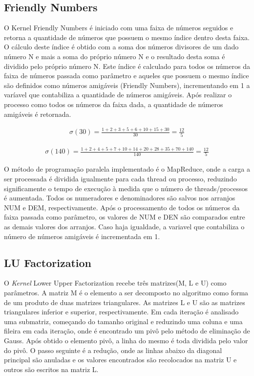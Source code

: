 \documentclass[12pt]{article}
\begin{document}
\subsection{Friendly Numbers}

O Kernel Friendly Numbers é iniciado com uma faixa de números seguidos e retorna a quantidade de números que possuem o mesmo índice dentro desta faixa. O cálculo deste índice é obtido com a soma dos números divisores de um dado número N e mais a soma do próprio número N e o resultado desta soma é dividido pelo próprio número N. Este índice é calculado para todos os números da faixa de números passada como parâmetro e aqueles que possuem o mesmo índice são definidos como números amigáveis (Friendly Numbers), incrementando em 1 a varíavel que contabiliza a quantidade de números amigáveis. Após realizar o processo como todos os números da faixa dada, a quantidade de números amigáveis é retornada. 

\begin{gather*}
{\sigma \left ( 30 \right )} =  \frac{1+2+3+5+6+10+15+30}{30} = \frac{12}{5}
\end{gather*}

\begin{gather*}
{\sigma \left ( 140 \right )} = \frac{1+2+4+5+7+10+14+20+28+35+70+140}{140}=\frac{12}{5}
\end{gather*}


O método de programação paralela implementado é o MapReduce, onde a carga a ser processada é dividida igualmente para cada thread ou processo, reduzindo significamente o tempo de execução à medida que o número de threads/processos é aumentada. Todos os numeradores e denominadores são salvos nos arranjos NUM e DEM, respectivamente. Após o processamento de todos os números da faixa passada como parâmetro,
os valores de NUM e DEN são comparados entre as demais valores dos arranjos. Caso haja igualdade, a variavel que contabiliza o número de números amigáveis é incrementada em 1.

\subsection{LU Factorization}

O \textit{Kernel} Lower Upper Factorization recebe três matrizes(M, L e U) como parâmetros. A matriz M é o elemento a ser decomposto no algoritmo como forma de um produto de duas matrizes triangulares. As matrizes L e U são as matrizes triangulares inferior e superior, respectivamente. Em cada iteração é analisado uma submatriz, começando do tamanho original e reduzindo uma coluna e uma fileira em cada iteração, onde é encontrado um pivô pelo método de eliminação de Gauss. Após obtido o elemento pivô, a linha do mesmo é toda dividida pelo valor do pivô. O passo seguinte é a redução, onde as linhas abaixo da diagonal principal são anuladas e os valores encontrados são recolocados na matriz U e outros são escritos na matriz L.
\end{document}
